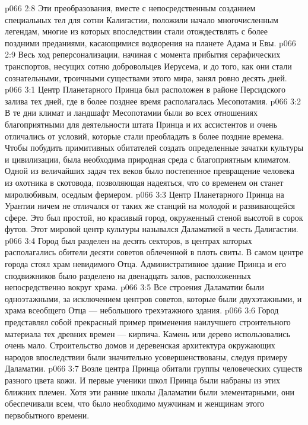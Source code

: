 \vs p066 2:8 \pc Эти преобразования, вместе с непосредственным созданием специальных тел для сотни Калигастии, положили начало многочисленным легендам, многие из которых впоследствии стали отождествлять с более поздними преданиями, касающимися водворения на планете Адама и Евы.
\vs p066 2:9 Весь ход реперсонализации, начиная с момента прибытия серафических транспортов, несущих сотню добровольцев Иерусема, и до того, как они стали сознательными, троичными существами этого мира, занял ровно десять дней.
\vs p066 3:1 Центр Планетарного Принца был расположен в районе Персидского залива тех дней, где в более позднее время располагалась Месопотамия.
\vs p066 3:2 В те дни климат и ландшафт Месопотамии были во всех отношениях благоприятными для деятельности штата Принца и их ассистентов и очень отличались от условий, которые стали преобладать в более поздние времена. Чтобы побудить примитивных обитателей создать определенные зачатки культуры и цивилизации, была необходима природная среда с благоприятным климатом. Одной из величайших задач тех веков было постепенное превращение человека из охотника в скотовода, позволяющая надеяться, что со временем он станет миролюбивым, оседлым фермером.
\vs p066 3:3 \pc Центр Планетарного Принца на Урантии ничем не отличался от таких же станций на молодой и развивающейся сфере. Это был простой, но красивый город, окруженный стеной высотой в сорок футов. Этот мировой центр культуры назывался Даламатией в честь Далигастии.
\vs p066 3:4 Город был разделен на десять секторов, в центрах которых располагались обители десяти советов облеченной в плоть свиты. В самом центре города стоял храм невидимого Отца. Административное здание Принца и его сподвижников было разделено на двенадцать залов, расположенных непосредственно вокруг храма.
\vs p066 3:5 Все строения Даламатии были одноэтажными, за исключением центров советов, которые были двухэтажными, и храма всеобщего Отца --- небольшого трехэтажного здания.
\vs p066 3:6 Город представлял собой прекрасный пример применения наилучшего строительного материала тех древних времен --- кирпича. Камень или дерево использовались очень мало. Строительство домов и деревенская архитектура окружающих народов впоследствии были значительно усовершенствованы, следуя примеру Даламатии.
\vs p066 3:7 \pc Возле центра Принца обитали группы человеческих существ разного цвета кожи. И первые ученики школ Принца были набраны из этих ближних племен. Хотя эти ранние школы Даламатии были элементарными, они обеспечивали всем, что было необходимо мужчинам и женщинам этого первобытного времени.
